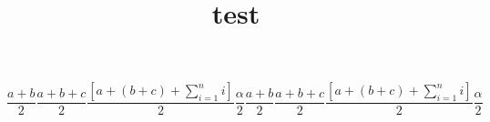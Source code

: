\documentclass{article}
\title{test}
\begin{document}
\maketitle
\tableofcontents


\[
  \frac{a+b}{2} \frac{a + b + c}{2} \frac{[a + (b + c) + \sum_{i=1}^{n} i]}{2} \frac{\alpha}{2}
  \frac{a+b}{2} \frac{a + b + c}{2} \frac{[a + (b + c) + \sum_{i=1}^{n} i]}{2} \frac{\alpha}{2}
\]
\end{document}

